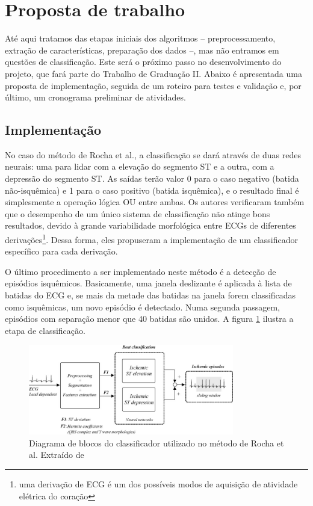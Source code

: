
\section{Proposta de trabalho}
\label{sec:section5}
Até aqui tratamos das etapas iniciais dos algoritmos -- preprocessamento, extração de características, preparação dos dados --, mas não entramos em questões de classificação. Este será o próximo passo no desenvolvimento do projeto, que fará parte do Trabalho de Graduação II. Abaixo é apresentada uma proposta de implementação, seguida de um roteiro para testes e validação e, por último, um cronograma preliminar de atividades.

\subsection{Implementação}
No caso do método de Rocha et al., a classificação se dará através de duas redes neurais: uma para lidar com a elevação do segmento ST e a outra, com a depressão do segmento ST. As saídas terão valor 0 para o caso negativo (batida não-isquêmica) e 1 para o caso positivo (batida isquêmica), e o resultado final é simplesmente a operação lógica OU entre ambas. Os autores verificaram também que o desempenho de um único sistema de classificação não atinge bons resultados, devido à grande variabilidade morfológica entre ECGs de diferentes derivações\footnote{uma derivação de ECG é um dos possíveis modos de aquisição de atividade elétrica do coração}. Dessa forma, eles propuseram a implementação de um classificador específico para cada derivação.

O último procedimento a ser implementado neste método é a detecção de episódios isquêmicos. Basicamente, uma janela deslizante é aplicada à lista de batidas do ECG e, se mais da metade das batidas na janela  forem classificadas como isquêmicas, um novo episódio é detectado. Numa segunda passagem, episódios com separação menor que 40 batidas são unidos. A figura \ref{fig:rocha_03} ilustra a etapa de classificação.

\begin{figure}[ht]
    \centering
    \includegraphics[width=0.8\textwidth]{figures/rocha_03.png}
    \caption{Diagrama de blocos do classificador utilizado no método de Rocha et al. Extraído de \cite{Rocha10}}
    \label{fig:rocha_03}
\end{figure}

